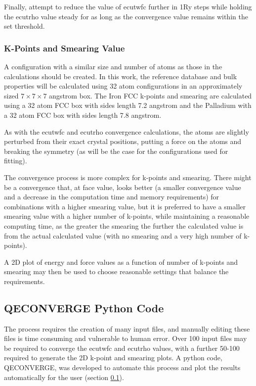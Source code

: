Finally, attempt to reduce the value of ecutwfc further in 1Ry steps while holding the ecutrho value steady for as long as the convergence value remains within the set threshold.

\subsubsection{K-Points and Smearing Value}

A configuration with a similar size and number of atoms as those in the calculations should be created.  In this work, the reference database and bulk properties will be calculated using 32 atom configurations in an approximately sized $7 \times 7 \times 7$ angstrom box.  The Iron FCC k-points and smearing are calculated using a 32 atom FCC box with sides length 7.2 angstrom and the Palladium with a 32 atom FCC box with sides length 7.8 angstrom.

As with the ecutwfc and ecutrho convergence calculations, the atoms are slightly perturbed from their exact crystal positions, putting a force on the atoms and breaking the symmetry (as will be the case for the configurations used for fitting). 

The convergence process is more complex for k-points and smearing.  There might be a convergence that, at face value, looks better (a smaller convergence value and a decrease in the computation time and memory requirements) for combinations with a higher smearing value, but it is preferred to have a smaller smearing value with a higher number of k-points, while maintaining a reasonable computing time, as the greater the smearing the further the calculated value is from the actual calculated value (with no smearing and a very high number of k-points).

A 2D plot of energy and force values as a function of number of k-points and smearing may then be used to choose reasonable settings that balance the requirements.







\FloatBarrier
\subsection{QECONVERGE Python Code}
\label{code:qeconverge}

The process requires the creation of many input files, and manually editing these files is time consuming and vulnerable to human error. Over 100 input files may be required to converge the ecutwfc and ecutrho values, with a further 50-100 required to generate the 2D k-point and smearing plots.  A python code, QECONVERGE, was developed to automate this process and plot the results automatically for the user (section \ref{code:qeconverge}).

